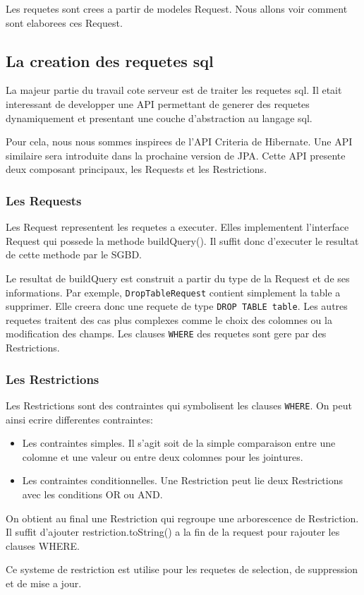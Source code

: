 Les requetes sont crees a partir de modeles Request. Nous allons voir comment sont elaborees ces Request.
\subsection{La creation des requetes sql}
La majeur partie du travail cote serveur est de traiter les requetes sql. Il etait interessant de developper une API permettant de generer des requetes dynamiquement et presentant une couche d'abstraction au langage sql.

Pour cela, nous nous sommes inspirees de l'API Criteria de Hibernate. Une API similaire sera introduite dans la prochaine version de JPA. Cette API presente deux composant principaux, les Requests et les Restrictions.
\subsubsection{Les Requests}
Les Request representent les requetes a executer. Elles implementent l'interface Request qui possede la methode buildQuery(). Il suffit donc d'executer le resultat de cette methode par le SGBD.

Le resultat de buildQuery est construit a partir du type de la Request et de ses informations. Par exemple, \texttt{DropTableRequest} contient simplement la table a supprimer. Elle creera donc une requete de type \texttt{DROP TABLE table}. Les autres requetes traitent des cas plus complexes comme le choix des colomnes ou la modification des champs. 
Les clauses \texttt{WHERE} des requetes sont gere par des Restrictions.
\subsubsection{Les Restrictions}
Les Restrictions sont des contraintes qui symbolisent les clauses \texttt{WHERE}. On peut ainsi ecrire differentes contraintes:
\begin{itemize}
 \item Les contraintes simples. Il s'agit soit de la simple comparaison entre une colomne et une valeur ou entre deux colomnes pour les jointures.
 \item Les contraintes conditionnelles. Une Restriction peut lie deux Restrictions avec les conditions OR ou AND.
\end{itemize}
On obtient au final une Restriction qui regroupe une arborescence de Restriction. Il suffit d'ajouter restriction.toString() a la fin de la request pour rajouter les clauses WHERE. 

Ce systeme de restriction est utilise pour les requetes de selection, de suppression et de mise a jour.
